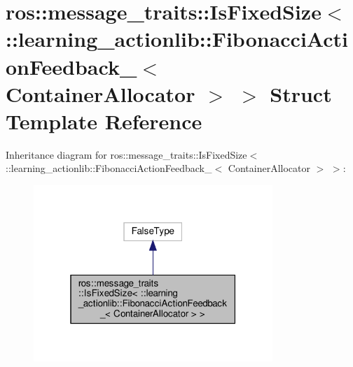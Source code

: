\hypertarget{structros_1_1message__traits_1_1IsFixedSize_3_01_1_1learning__actionlib_1_1FibonacciActionFeedba53ab24604fe391cd5d35f007a2a56414}{}\section{ros\+:\+:message\+\_\+traits\+:\+:Is\+Fixed\+Size$<$ \+:\+:learning\+\_\+actionlib\+:\+:Fibonacci\+Action\+Feedback\+\_\+$<$ Container\+Allocator $>$ $>$ Struct Template Reference}
\label{structros_1_1message__traits_1_1IsFixedSize_3_01_1_1learning__actionlib_1_1FibonacciActionFeedba53ab24604fe391cd5d35f007a2a56414}


Inheritance diagram for ros\+:\+:message\+\_\+traits\+:\+:Is\+Fixed\+Size$<$ \+:\+:learning\+\_\+actionlib\+:\+:Fibonacci\+Action\+Feedback\+\_\+$<$ Container\+Allocator $>$ $>$\+:
\nopagebreak
\begin{figure}[H]
\begin{center}
\leavevmode
\includegraphics[width=256pt]{structros_1_1message__traits_1_1IsFixedSize_3_01_1_1learning__actionlib_1_1FibonacciActionFeedbaff4845b955949dd15b6a6d8b84020c5c}
\end{center}
\end{figure}


